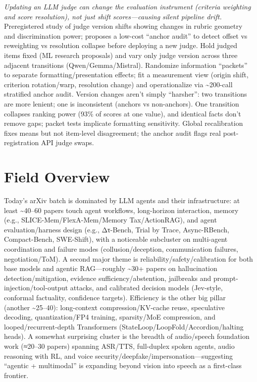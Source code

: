 \documentclass[12pt,letterpaper]{article}
\begin{document}
{\small\textit{Updating an LLM judge can change the evaluation instrument (criteria weighting and score resolution), not just shift scores---causing silent pipeline drift.}}\\[1pt]
{\footnotesize Preregistered study of judge version shifts showing changes in rubric geometry and discrimination power; proposes a low-cost ``anchor audit'' to detect offset vs reweighting vs resolution collapse before deploying a new judge. Hold judged items fixed (ML research proposals) and vary only judge version across three adjacent transitions (Qwen/Gemma/Mistral). Randomize information ``packets'' to separate formatting/presentation effects; fit a measurement view (origin shift, criterion rotation/warp, resolution change) and operationalize via \textasciitilde{}200-call stratified anchor audit. Version changes aren't simply ``harsher'': two transitions are more lenient; one is inconsistent (anchors vs non-anchors). One transition collapses ranking power (93\% of scores at one value), and identical facts don't remove gaps; packet tests implicate formatting sensitivity. Global recalibration fixes means but not item-level disagreement; the anchor audit flags real post-registration API judge swaps.}

\medskip



\section*{Field Overview}
{\footnotesize Today's arXiv batch is dominated by LLM agents and their infrastructure: at least \textasciitilde{}40--60 papers touch agent workflows, long-horizon interaction, memory (e.g., SLICE-Mem/FlexA-Mem/Memory Tax/ActionRAG), and agent evaluation/harness design (e.g., Δτ-Bench, Trial by Trace, Async-RBench, Compact-Bench, SWE-Shift), with a noticeable subcluster on multi-agent coordination and failure modes (collusion/deception, communication failures, negotiation/ToM). A second major theme is reliability/safety/calibration for both base models and agentic RAG---roughly \textasciitilde{}30+ papers on hallucination detection/mitigation, evidence sufficiency/abstention, jailbreaks and prompt-injection/tool-output attacks, and calibrated decision models (Jev-style, conformal factuality, confidence targets). Efficiency is the other big pillar (another \textasciitilde{}25--40): long-context compression/KV-cache reuse, speculative decoding, quantization/FP4 training, sparsity/MoE compression, and looped/recurrent-depth Transformers (StateLoop/LoopFold/Accordion/halting heads). A somewhat surprising cluster is the breadth of audio/speech foundation work (≈20--30 papers) spanning ASR/TTS, full-duplex spoken agents, audio reasoning with RL, and voice security/deepfake/impersonation---suggesting ``agentic + multimodal'' is expanding beyond vision into speech as a first-class frontier.}
\end{document}
